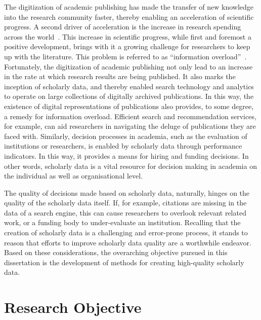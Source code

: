 The digitization of academic publishing has made the transfer of new knowledge into the research community faster, thereby enabling an acceleration of scientific progress. A second driver of acceleration is the increase in research spending across the world~\cite{CRS2022,OECD2023}.
This increase in scientific progress, while first and foremost a positive development, brings with it a growing challenge for researchers to keep up with the literature. This problem is referred to as ``information overload''~\cite{Landhuis2016}.
Fortunately, the digitization of academic publishing not only lead to %
an increase in the rate at which research results are being published. It also marks the inception of scholarly data, and thereby enabled search technology and analytics to operate on large collections of digitally archived publications.
In this way, the existence of digital representations of publications also provides, to some degree, a remedy for information overload. Efficient search and recommendation services, for example, can aid researchers in navigating the deluge of publications they are faced with.
Similarly, decision processes in academia, such as the evaluation of institutions or researchers, is enabled by scholarly data through performance indicators. In this way, it provides a means for hiring and funding decisions.
In other words, scholarly data is a vital resource for decision making in academia on the individual as well as organisational level.

The quality of decisions made based on scholarly data, naturally, hinges on the quality of the scholarly data itself. If, for example, citations are missing in the data of a search engine, this can cause researchers to overlook relevant related work, or a funding body to under-evaluate an institution. Recalling that the creation of scholarly data is a challenging and error-prone process, it stands to reason that efforts to improve scholarly data quality are a worthwhile endeavor. Based on these considerations, the overarching objective pursued in this dissertation is the development of methods for creating high-quality scholarly data.


\section{Research Objective}\label{sec:intro-researchobj}

